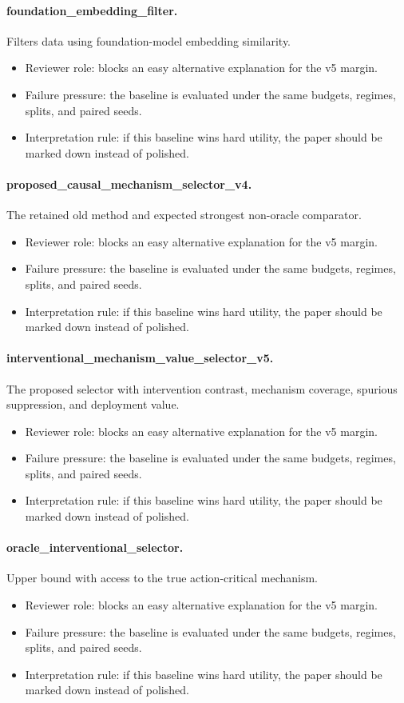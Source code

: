 \documentclass{article}
\begin{document}
\paragraph{foundation\_embedding\_filter.} Filters data using foundation-model embedding similarity.
\begin{itemize}
\item Reviewer role: blocks an easy alternative explanation for the v5 margin.
\item Failure pressure: the baseline is evaluated under the same budgets, regimes, splits, and paired seeds.
\item Interpretation rule: if this baseline wins hard utility, the paper should be marked down instead of polished.
\end{itemize}
\paragraph{proposed\_causal\_mechanism\_selector\_v4.} The retained old method and expected strongest non-oracle comparator.
\begin{itemize}
\item Reviewer role: blocks an easy alternative explanation for the v5 margin.
\item Failure pressure: the baseline is evaluated under the same budgets, regimes, splits, and paired seeds.
\item Interpretation rule: if this baseline wins hard utility, the paper should be marked down instead of polished.
\end{itemize}
\paragraph{interventional\_mechanism\_value\_selector\_v5.} The proposed selector with intervention contrast, mechanism coverage, spurious suppression, and deployment value.
\begin{itemize}
\item Reviewer role: blocks an easy alternative explanation for the v5 margin.
\item Failure pressure: the baseline is evaluated under the same budgets, regimes, splits, and paired seeds.
\item Interpretation rule: if this baseline wins hard utility, the paper should be marked down instead of polished.
\end{itemize}
\paragraph{oracle\_interventional\_selector.} Upper bound with access to the true action-critical mechanism.
\begin{itemize}
\item Reviewer role: blocks an easy alternative explanation for the v5 margin.
\item Failure pressure: the baseline is evaluated under the same budgets, regimes, splits, and paired seeds.
\item Interpretation rule: if this baseline wins hard utility, the paper should be marked down instead of polished.
\end{itemize}
\clearpage
\end{document}
